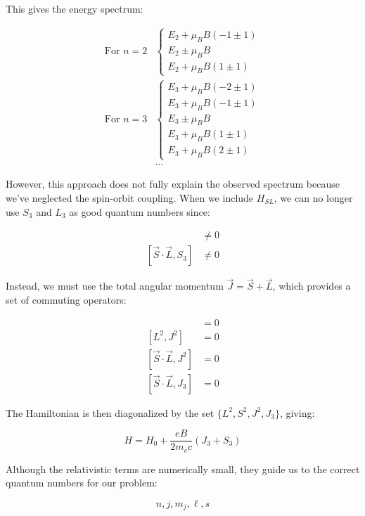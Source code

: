 \documentclass[italian]{HKNdocument}
\begin{document}
This gives the energy spectrum:

\begin{align}
\text{For } n=2&\left\{\begin{array}{l}
E_2+\mu_B B(-1\pm 1)\\
E_2\pm\mu_B B\\
E_2+\mu_B B(1\pm 1)
\end{array}\right.\\
\text{For } n=3&\left\{\begin{array}{l}
E_3+\mu_B B(-2\pm 1)\\
E_3+\mu_B B(-1\pm 1)\\
E_3\pm\mu_B B\\
E_3+\mu_B B(1\pm 1)\\
E_3+\mu_B B(2\pm 1)
\end{array}\right.\\
&\ldots
\end{align}

However, this approach does not fully explain the observed spectrum because we've neglected the spin-orbit coupling. When we include $H_{SL}$, we can no longer use $S_3$ and $L_3$ as good quantum numbers since:

\begin{align}
[\vec{S}\cdot\vec{L}, L_3] &\neq 0 \\
[\vec{S}\cdot\vec{L}, S_3] &\neq 0
\end{align}

Instead, we must use the total angular momentum $\vec{J}=\vec{S}+\vec{L}$, which provides a set of commuting operators:

\begin{align}
[S^2, J^2] &= 0\\
[L^2, J^2] &= 0\\
[\vec{S}\cdot\vec{L}, J^2] &= 0 \\
[\vec{S}\cdot\vec{L}, J_3] &= 0
\end{align}

The Hamiltonian is then diagonalized by the set $\{L^2, S^2, J^2, J_3\}$, giving:

\begin{equation}
H=H_0+\frac{eB}{2m_e c}(J_3+S_3)
\end{equation}


Although the relativistic terms are numerically small, they guide us to the correct quantum numbers for our problem:

\begin{equation}
n, j, m_j, \ell, s
\end{equation}
\end{document}

